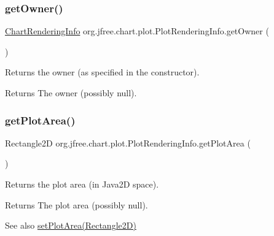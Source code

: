 \subsubsection{\texorpdfstring{get\+Owner()}{getOwner()}}
{\footnotesize\ttfamily \mbox{\hyperlink{classorg_1_1jfree_1_1chart_1_1_chart_rendering_info}{Chart\+Rendering\+Info}} org.\+jfree.\+chart.\+plot.\+Plot\+Rendering\+Info.\+get\+Owner (\begin{DoxyParamCaption}{ }\end{DoxyParamCaption})}

Returns the owner (as specified in the constructor).

\begin{DoxyReturn}{Returns}
The owner (possibly {\ttfamily null}). 
\end{DoxyReturn}
\mbox{\label{classorg_1_1jfree_1_1chart_1_1plot_1_1_plot_rendering_info_aeba057ee7d70678df2f7f88314de2d69}} 
\subsubsection{\texorpdfstring{get\+Plot\+Area()}{getPlotArea()}}
{\footnotesize\ttfamily Rectangle2D org.\+jfree.\+chart.\+plot.\+Plot\+Rendering\+Info.\+get\+Plot\+Area (\begin{DoxyParamCaption}{ }\end{DoxyParamCaption})}

Returns the plot area (in Java2D space).

\begin{DoxyReturn}{Returns}
The plot area (possibly {\ttfamily null}).
\end{DoxyReturn}
\begin{DoxySeeAlso}{See also}
\mbox{\hyperlink{classorg_1_1jfree_1_1chart_1_1plot_1_1_plot_rendering_info_ade390a6d8612deaded6505d39cb2d0ac}{set\+Plot\+Area(\+Rectangle2\+D)}} 
\end{DoxySeeAlso}
\mbox{\label{classorg_1_1jfree_1_1chart_1_1plot_1_1_plot_rendering_info_a7768ec5686a73938d8a3aca312e52fa6}} 
